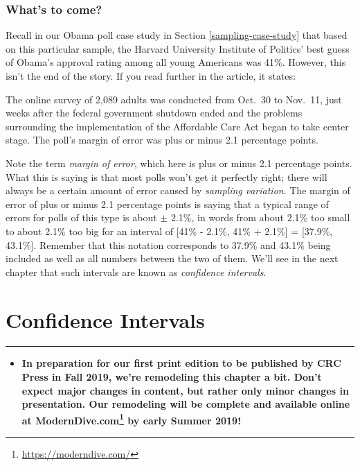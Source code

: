 \documentclass[12pt, krantz2,]{krantz}
\renewenvironment{quote}{\begin{VF}}{\end{VF}}
\renewcommand{\href}[2]{#2\footnote{\url{#1}}}
\newenvironment{rmdblock}[1]
  {\begin{shaded*}
  \begin{itemize}
  \renewcommand{\labelitemi}{
    \raisebox{-.7\height}[0pt][0pt]{
    }
  }
  \item
  }
  {
  \end{itemize}
  \end{shaded*}
  }
\newenvironment{announcement}
  {\begin{rmdblock}{warning}}
  {\end{rmdblock}}
\begin{document}
\hypertarget{whats-to-come-6}{%
\subsection{What's to come?}\label{whats-to-come-6}}

Recall in our Obama poll case study in Section \ref{sampling-case-study} that based on this particular sample, the Harvard University Institute of Politics' best guess of Obama's approval rating among all young Americans was 41\%. However, this isn't the end of the story. If you read further in the article, it states:

\begin{quote}
The online survey of 2,089 adults was conducted from Oct.~30 to Nov.~11, just weeks after the federal government shutdown ended and the problems surrounding the implementation of the Affordable Care Act began to take center stage. The poll's margin of error was plus or minus 2.1 percentage points.
\end{quote}

Note the term \emph{margin of error}, which here is plus or minus 2.1 percentage points. What this is saying is that most polls won't get it perfectly right; there will always be a certain amount of error caused by \emph{sampling variation}. The margin of error of plus or minus 2.1 percentage points is saying that a typical range of errors for polls of this type is about \(\pm\) 2.1\%, in words from about 2.1\% too small to about 2.1\% too big for an interval of {[}41\% - 2.1\%, 41\% + 2.1\%{]} = {[}37.9\%, 43.1\%{]}. Remember that this notation corresponds to 37.9\% and 43.1\% being included as well as all numbers between the two of them. We'll see in the next chapter that such intervals are known as \emph{confidence intervals}.

\hypertarget{confidence-intervals}{%
\chapter{Confidence Intervals}\label{confidence-intervals}}

\begin{center}\rule{0.5\linewidth}{\linethickness}\end{center}

\begin{announcement}
\textbf{In preparation for our first print edition to be published by
CRC Press in Fall 2019, we're remodeling this chapter a bit. Don't
expect major changes in content, but rather only minor changes in
presentation. Our remodeling will be complete and available online at
\href{https://moderndive.com/}{ModernDive.com} by early Summer 2019!}
\end{announcement}
\end{document}
